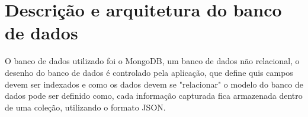 \chapter{Descrição e arquitetura do banco de dados}

O banco de dados utilizado foi o MongoDB, um banco de dados não relacional, o desenho do banco de dados é controlado pela aplicação, que define quis campos devem ser indexados e como os dados devem se "relacionar" o modelo do banco de dados pode ser definido como, cada informação capturada fica armazenada dentro de uma coleção, utilizando o formato JSON.